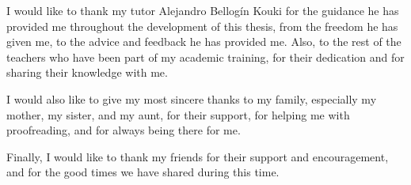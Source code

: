 I would like to thank my tutor Alejandro Bellogín Kouki for the guidance he has provided me throughout the development of this thesis, from the freedom he has given me, to the advice and feedback he has provided me. Also, to the rest of the teachers who have been part of my academic training, for their dedication and for sharing their knowledge with me.

I would also like to give my most sincere thanks to my family, especially my mother, my sister, and my aunt, for their support, for helping me with proofreading, and for always being there for me.

Finally, I would like to thank my friends for their support and encouragement, and for the good times we have shared during this time.